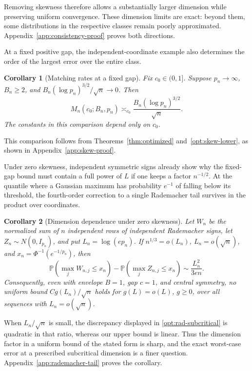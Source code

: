 \documentclass[11pt,letterpaper]{article}
\newtheorem{corollary}{Corollary}
\theoremstyle{remark}
\newcommand{\Pp}{\mathbb P}
\begin{document}
Removing skewness therefore allows a substantially larger dimension
while preserving uniform convergence. These dimension limits are
exact: beyond them, some distributions in the respective classes
remain poorly approximated. Appendix~\ref{app:consistency-proof}
proves both directions.

At a fixed positive gap, the independent-coordinate example also
determines the order of the largest error over the entire class.
\begin{corollary}[Matching rates at a fixed gap]\label{opt:matching-rates}
Fix \(c_0\in(0,1]\). Suppose \(p_n\to\infty\), \(B_n\ge2\), and
\(B_n(\log p_n)^{3/2}/\sqrt n\to0\). Then
\begin{equation}
 M_n(c_0;B_n,p_n)\asymp_{c_0}
 \frac{B_n(\log p_n)^{3/2}}{\sqrt n}.
 \label{opt:matching-minimax}
\end{equation}
The constants in this comparison depend only on \(c_0\).
\end{corollary}

This comparison follows from Theorems~\ref{thm:optimized}
and~\ref{opt:skew-lower}, as shown in
Appendix~\ref{app:skew-proof}.

Under zero skewness, independent symmetric signs already show why the
fixed-gap bound must contain a full power of \(L\) if one keeps a factor
\(n^{-1/2}\). At the quantile where a Gaussian maximum has probability
\(e^{-1}\) of falling below its threshold, the fourth-order correction
to a single Rademacher tail survives in the product over coordinates.

\begin{corollary}[Dimension dependence under zero skewness]\label{opt:zero-log}
Let \(W_n\) be the normalized sum of \(n\) independent rows of
independent Rademacher signs, let \(Z_n\sim N(0,I_{p_n})\), and put
\(L_n=\log(ep_n)\). If \(n^{1/3}=o(L_n)\), \(L_n=o(\sqrt n)\), and
\(x_n=\Phi^{-1}(e^{-1/p_n})\), then
\begin{equation}
 \Pp(\max_j W_{n,j}\le x_n)-\Pp(\max_j Z_{n,j}\le x_n)
 \sim \frac{L_n^2}{3en}.
 \label{opt:rad-subcritical}
\end{equation}
Consequently, even with envelope \(B=1\), gap \(c=1\), and central
symmetry, no uniform bound \(C g(L_n)/\sqrt n\) holds for
\(g(L)=o(L)\), \(g\ge0\), over all sequences with \(L_n=o(\sqrt n)\).
\end{corollary}

When \(L_n/\sqrt n\) is small, the discrepancy displayed in
\eqref{opt:rad-subcritical} is quadratic in that ratio, whereas our
upper bound is linear. Thus the dimension factor in a uniform bound
of the stated form is sharp, and the exact worst-case error at a
prescribed subcritical dimension is a finer question.
Appendix~\ref{app:rademacher-tail} proves the corollary.
\end{document}
